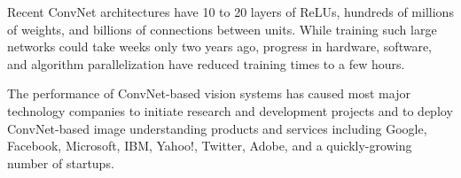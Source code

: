 \documentclass[10pts]{article}
\newcommand{\citep}[1]{\cite{#1}}
\begin{document}
Recent ConvNet architectures have 10 to 20 layers of ReLUs, hundreds
of millions of weights, and billions of connections between
units. While training such large networks could take weeks only two
years ago, progress in hardware, software, and algorithm
parallelization have reduced training times to a few hours.

The performance of ConvNet-based vision systems has caused most major
technology companies to initiate research and development projects and
to deploy ConvNet-based image understanding products and services
including Google, Facebook, Microsoft, IBM, Yahoo!, Twitter, Adobe,
and a quickly-growing number of startups.


\end{document}
